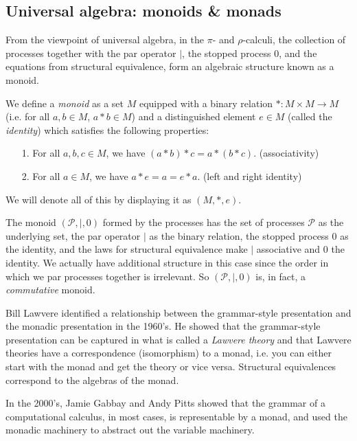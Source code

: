\documentclass[12pt]{article}
\numberwithin{equation}{section}
\begin{document}

\subsection{Universal algebra: monoids \& monads}
From the viewpoint of universal algebra, in the $\pi$- and $\rho$-calculi, the collection of processes together with the par operator $|$, the stopped process 0, and the equations from structural equivalence, form an algebraic structure known as a monoid.

We define a \emph{monoid} as a set $M$ equipped with a binary relation $*: M \times M \rightarrow M$ (i.e. for all $a, b \in M$, $a * b \in M$) and a distinguished element $e \in M$ (called the \emph{identity}) which satisfies the following properties:
\begin{enumerate}
\item[1.] For all $a, b, c \in M$, we have $(a * b) * c = a* (b * c)$. (associativity)

\item[2.] For all $a \in M$, we have $a * e = a = e * a$. (left and right identity)
\end{enumerate}
We will denote all of this by displaying it as $(M, *, e)$.

The monoid $(\mathcal{P}, |, 0)$ formed by the processes has the set of processes $\mathcal{P}$ as the underlying set, the par operator $|$ as the binary relation, the stopped process $0$ as the identity, and the laws for structural equivalence make $|$ associative and $0$ the identity. We actually have additional structure in this case since the order in which we par processes together is irrelevant. So $(\mathcal{P}, |, 0)$ is, in fact, a \emph{commutative} monoid.

Bill Lawvere identified a relationship between the grammar-style presentation and the monadic presentation in the 1960's. He showed that the grammar-style presentation can be captured in what is called a \emph{Lawvere theory} and that Lawvere theories have a correspondence (isomorphism) to a monad, i.e. you can either start with the monad and get the theory or vice versa. Structural equivalences correspond to the algebras of the monad.

In the 2000's, Jamie Gabbay and Andy Pitts showed that the grammar of a computational calculus, in most cases, is representable by a monad, and used the monadic machinery to abstract out the variable machinery.
\end{document}

